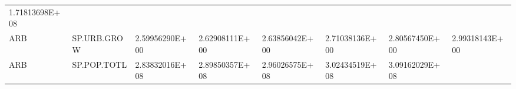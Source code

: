 \documentclass[]{article}
\begin{document}
\begin{longtable}[]{@{}llllllll@{}}
\begin{minipage}[t]{0.11\columnwidth}
1.71813698E+08\strut
\end{minipage}\tabularnewline
\begin{minipage}[t]{0.06\columnwidth}\raggedright
ARB\strut
\end{minipage} & \begin{minipage}[t]{0.08\columnwidth}\raggedright
SP.URB.GROW\strut
\end{minipage} & \begin{minipage}[t]{0.11\columnwidth}\raggedright
2.59956290E+00\strut
\end{minipage} & \begin{minipage}[t]{0.11\columnwidth}\raggedright
2.62908111E+00\strut
\end{minipage} & \begin{minipage}[t]{0.11\columnwidth}\raggedright
2.63856042E+00\strut
\end{minipage} & \begin{minipage}[t]{0.11\columnwidth}\raggedright
2.71038136E+00\strut
\end{minipage} & \begin{minipage}[t]{0.11\columnwidth}\raggedright
2.80567450E+00\strut
\end{minipage} & \begin{minipage}[t]{0.11\columnwidth}\raggedright
2.99318143E+00\strut
\end{minipage}\tabularnewline
\begin{minipage}[t]{0.06\columnwidth}\raggedright
ARB\strut
\end{minipage} & \begin{minipage}[t]{0.08\columnwidth}\raggedright
SP.POP.TOTL\strut
\end{minipage} & \begin{minipage}[t]{0.11\columnwidth}\raggedright
2.83832016E+08\strut
\end{minipage} & \begin{minipage}[t]{0.11\columnwidth}\raggedright
2.89850357E+08\strut
\end{minipage} & \begin{minipage}[t]{0.11\columnwidth}\raggedright
2.96026575E+08\strut
\end{minipage} & \begin{minipage}[t]{0.11\columnwidth}\raggedright
3.02434519E+08\strut
\end{minipage} & \begin{minipage}[t]{0.11\columnwidth}\raggedright
3.09162029E+08\strut
\end{minipage} & \begin{minipage}[t]{0.11\columnwidth}\raggedright

\end{minipage}
\end{longtable}
\end{document}
